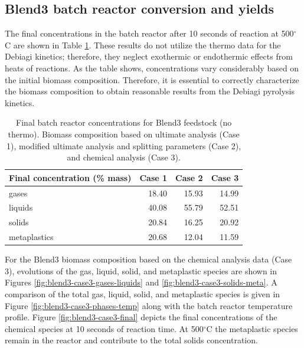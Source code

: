\subsection{Blend3 batch reactor conversion and yields}

The final concentrations in the batch reactor after 10 seconds of reaction at 500$^{\circ}$C are shown in Table \ref{tab:blend3-batch-final}. These results do not utilize the thermo data for the Debiagi kinetics; therefore, they neglect exothermic or endothermic effects from heats of reactions. As the table shows, concentrations vary considerably based on the initial biomass composition. Therefore, it is essential to correctly characterize the biomass composition to obtain reasonable results from the Debiagi pyrolysis kinetics.

\begin{table}[H]
    \centering
    \caption{Final batch reactor concentrations for Blend3 feedstock (no thermo). Biomass composition based on ultimate analysis (Case 1), modified ultimate analysis and splitting parameters (Case 2), and chemical analysis (Case 3).}
    \label{tab:blend3-batch-final}
    \begin{tabular}{lrrr}
        \toprule
        Final concentration (\% mass) & Case 1 & Case 2 & Case 3 \\
        \midrule
        gases         & 18.40 & 15.93 & 14.99 \\
        liquids       & 40.08 & 55.79 & 52.51 \\
        solids        & 20.84 & 16.25 & 20.92 \\
        metaplastics  & 20.68 & 12.04 & 11.59 \\
        \bottomrule
    \end{tabular}
\end{table}

For the Blend3 biomass composition based on the chemical analysis data (Case 3), evolutions of the gas, liquid, solid, and metaplastic species are shown in Figures \ref{fig:blend3-case3-gases-liquids} and \ref{fig:blend3-case3-solids-meta}. A comparison of the total gas, liquid, solid, and metaplastic species is given in Figure \ref{fig:blend3-case3-phases-temp} along with the batch reactor temperature profile. Figure \ref{fig:blend3-case3-final} depicts the final concentrations of the chemical species at 10 seconds of reaction time. At 500$^{\circ}$C the metaplastic species remain in the reactor and contribute to the total solids concentration.

